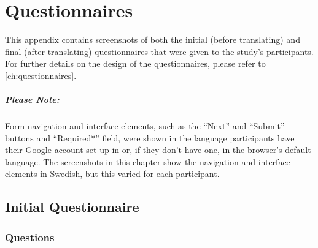 
\chapter{Questionnaires}
\label{an:questionnaires}


\noindent This appendix contains screenshots of both the initial (before translating) and final (after translating) questionnaires that were given to the study's participants. For further details on the design of the questionnaires, please refer to \autoref{ch:questionnaires}.

\paragraph{Please Note:} Form navigation and interface elements, such as the ``Next'' and ``Submit'' buttons and ``Required*'' field, were shown in the language participants have their Google account set up in or, if they don't have one, in the browser's default language. The screenshots in this chapter show the navigation and interface elements in Swedish, but this varied for each participant.


\section{Initial Questionnaire}

\subsection{Questions}


